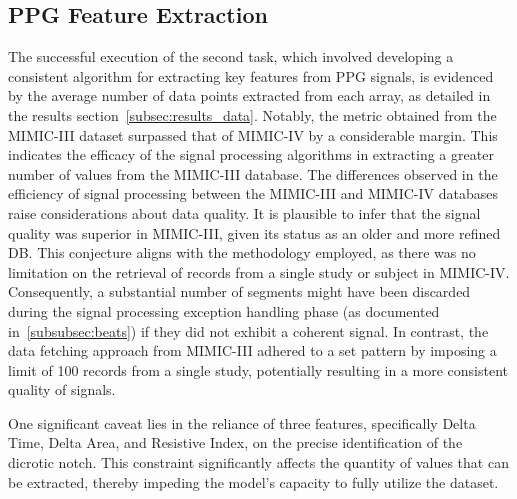 \subsection{PPG Feature Extraction}
\label{subsec:ppg-feature-extraction}

The successful execution of the second task, which involved developing a consistent algorithm for extracting key features from PPG signals,
is evidenced by the average number of data points extracted from each array, as detailed in the results section~\ref{subsec:results_data}.
Notably, the metric obtained from the MIMIC-III dataset surpassed that of MIMIC-IV by a considerable margin.
This indicates the efficacy of the signal processing algorithms in extracting a greater number of values from the MIMIC-III database.
The differences observed in the efficiency of signal processing between the MIMIC-III and MIMIC-IV databases raise considerations about data quality.
It is plausible to infer that the signal quality was superior in MIMIC-III, given its status as an older and more refined DB\@.
This conjecture aligns with the methodology employed, as there was no limitation on the retrieval of records from a single study or subject in MIMIC-IV\@.
Consequently, a substantial number of segments might have been discarded during the signal processing exception handling phase (as documented in~\ref{subsubsec:beats}) if they did not exhibit a coherent signal.
In contrast, the data fetching approach from MIMIC-III adhered to a set pattern by imposing a limit of 100 records from a single study, potentially resulting in a more consistent quality of signals.

One significant caveat lies in the reliance of three features, specifically Delta Time, Delta Area, and Resistive Index, on the precise identification of the dicrotic notch.
This constraint significantly affects the quantity of values that can be extracted, thereby impeding the model's capacity to fully utilize the dataset.

